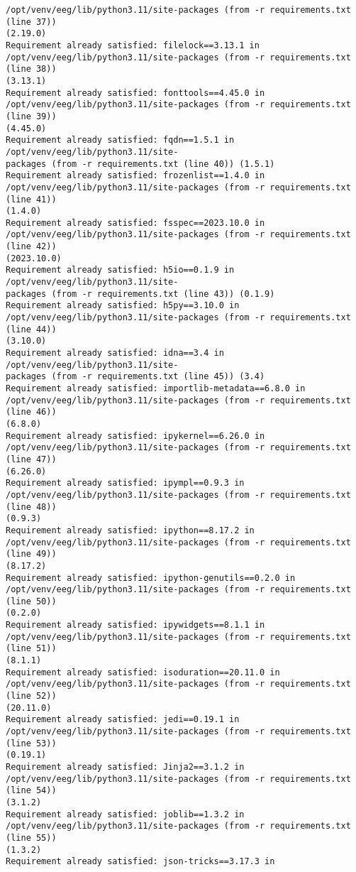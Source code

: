 \documentclass[11pt]{article}
\begin{document}
\begin{Verbatim}[commandchars=\\\{\}]
/opt/venv/eeg/lib/python3.11/site-packages (from -r requirements.txt (line 37))
(2.19.0)
Requirement already satisfied: filelock==3.13.1 in
/opt/venv/eeg/lib/python3.11/site-packages (from -r requirements.txt (line 38))
(3.13.1)
Requirement already satisfied: fonttools==4.45.0 in
/opt/venv/eeg/lib/python3.11/site-packages (from -r requirements.txt (line 39))
(4.45.0)
Requirement already satisfied: fqdn==1.5.1 in /opt/venv/eeg/lib/python3.11/site-
packages (from -r requirements.txt (line 40)) (1.5.1)
Requirement already satisfied: frozenlist==1.4.0 in
/opt/venv/eeg/lib/python3.11/site-packages (from -r requirements.txt (line 41))
(1.4.0)
Requirement already satisfied: fsspec==2023.10.0 in
/opt/venv/eeg/lib/python3.11/site-packages (from -r requirements.txt (line 42))
(2023.10.0)
Requirement already satisfied: h5io==0.1.9 in /opt/venv/eeg/lib/python3.11/site-
packages (from -r requirements.txt (line 43)) (0.1.9)
Requirement already satisfied: h5py==3.10.0 in
/opt/venv/eeg/lib/python3.11/site-packages (from -r requirements.txt (line 44))
(3.10.0)
Requirement already satisfied: idna==3.4 in /opt/venv/eeg/lib/python3.11/site-
packages (from -r requirements.txt (line 45)) (3.4)
Requirement already satisfied: importlib-metadata==6.8.0 in
/opt/venv/eeg/lib/python3.11/site-packages (from -r requirements.txt (line 46))
(6.8.0)
Requirement already satisfied: ipykernel==6.26.0 in
/opt/venv/eeg/lib/python3.11/site-packages (from -r requirements.txt (line 47))
(6.26.0)
Requirement already satisfied: ipympl==0.9.3 in
/opt/venv/eeg/lib/python3.11/site-packages (from -r requirements.txt (line 48))
(0.9.3)
Requirement already satisfied: ipython==8.17.2 in
/opt/venv/eeg/lib/python3.11/site-packages (from -r requirements.txt (line 49))
(8.17.2)
Requirement already satisfied: ipython-genutils==0.2.0 in
/opt/venv/eeg/lib/python3.11/site-packages (from -r requirements.txt (line 50))
(0.2.0)
Requirement already satisfied: ipywidgets==8.1.1 in
/opt/venv/eeg/lib/python3.11/site-packages (from -r requirements.txt (line 51))
(8.1.1)
Requirement already satisfied: isoduration==20.11.0 in
/opt/venv/eeg/lib/python3.11/site-packages (from -r requirements.txt (line 52))
(20.11.0)
Requirement already satisfied: jedi==0.19.1 in
/opt/venv/eeg/lib/python3.11/site-packages (from -r requirements.txt (line 53))
(0.19.1)
Requirement already satisfied: Jinja2==3.1.2 in
/opt/venv/eeg/lib/python3.11/site-packages (from -r requirements.txt (line 54))
(3.1.2)
Requirement already satisfied: joblib==1.3.2 in
/opt/venv/eeg/lib/python3.11/site-packages (from -r requirements.txt (line 55))
(1.3.2)
Requirement already satisfied: json-tricks==3.17.3 in

\end{Verbatim}
\end{document}
